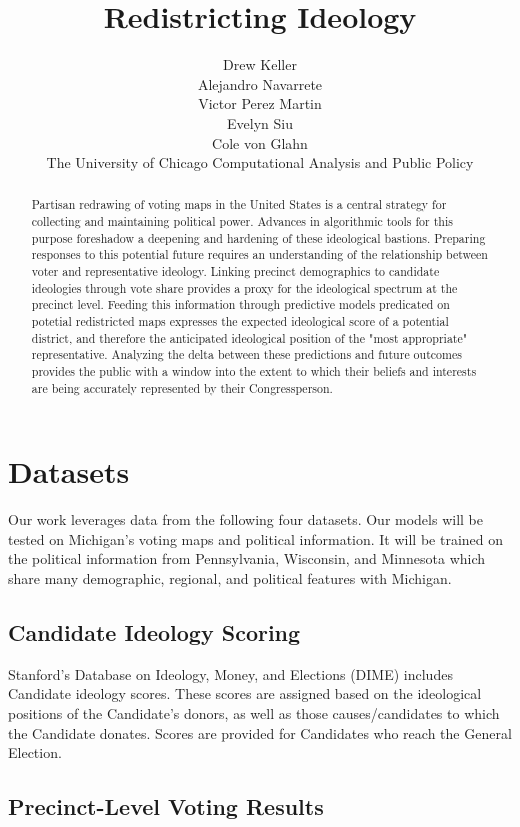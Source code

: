 \documentclass{article}
\title{Redistricting Ideology}
\author{
  Drew Keller \\
  Alejandro Navarrete \\
  Victor Perez Martin \\
  Evelyn Siu \\
  Cole von Glahn \\
  The University of Chicago
  Computational Analysis and Public Policy
}
\begin{document}
\maketitle


\begin{abstract}
  Partisan redrawing of voting maps in the United States is a central strategy for collecting and 
  maintaining political power. Advances in algorithmic tools for this purpose foreshadow a 
  deepening and hardening of these ideological bastions. Preparing responses to this potential
  future requires an understanding of the relationship between voter and representative ideology.
  Linking precinct demographics to candidate ideologies through vote share provides a proxy for the 
  ideological spectrum at the precinct level. Feeding this information through predictive models
  predicated on potetial redistricted maps expresses the expected ideological score of a potential
  district, and therefore the anticipated ideological position of the "most appropriate" representative.
  Analyzing the delta between these predictions and future outcomes provides the public with a window 
  into the extent to which their beliefs and interests are being accurately represented by their
  Congressperson.
\end{abstract}


\section{Datasets}


Our work leverages data from the following four datasets. Our models will be
tested on Michigan's voting maps and political information. It will be trained
on the political information from Pennsylvania, Wisconsin, and Minnesota which
share many demographic, regional, and political features with Michigan. 

\subsection{Candidate Ideology Scoring}


Stanford's Database on Ideology, Money, and Elections (DIME) includes
Candidate ideology scores. These scores are assigned based on
the ideological positions of the Candidate's donors, as well as those
causes/candidates to which the Candidate donates. Scores are provided
for Candidates who reach the General Election.


\subsection{Precinct-Level Voting Results}
\end{document}
